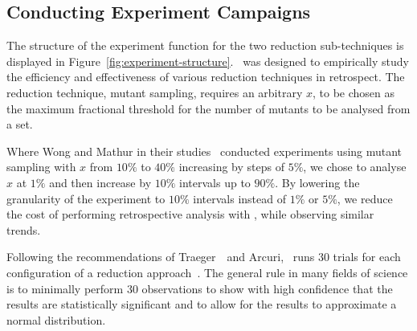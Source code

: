 \subsection{Conducting Experiment Campaigns}




The structure of the experiment function for the two reduction sub-techniques is displayed in
Figure~\ref{fig:experiment-structure}. \mr~was designed to empirically study the efficiency and effectiveness of various
reduction techniques in retrospect. The reduction technique, mutant sampling, requires an arbitrary $x$, to be chosen as
the maximum fractional threshold for the number of mutants to be analysed from a set.

Where Wong and Mathur in their studies~\cite{mathur1994empirical, wong1993mutation} conducted experiments using mutant
sampling with $x$ from $10\%$ to $40\%$ increasing by steps of $5\%$, we chose to analyse $x$ at $1\%$ and then increase
by $10\%$ intervals up to $90\%$. By lowering the granularity of the experiment to $10\%$ intervals instead of $1\%$ or
$5\%$, we reduce the cost of performing retrospective analysis with \mr, while observing similar trends.

Following the recommendations of Traeger~\etal~and Arcuri, \mr~runs 30 trials for each configuration of a reduction
approach~\cite{traeger2008nine, arcuri2014hitchhiker}. The general rule in many fields of science is to minimally
perform 30 observations to show with high confidence that the results are statistically significant and to allow for the
results to approximate a normal distribution.
